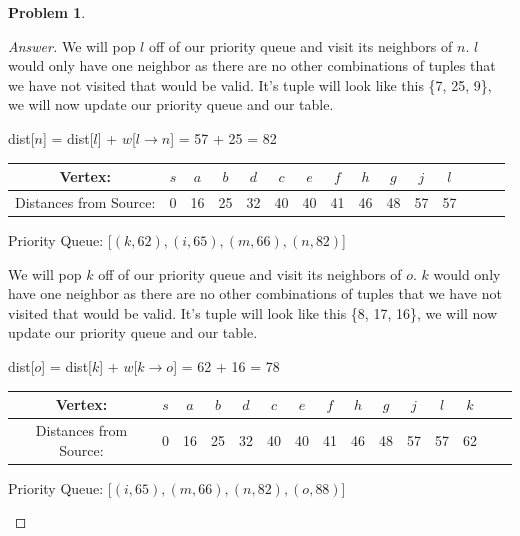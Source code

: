 \documentclass[11pt]{article}
\theoremstyle{definition}
\theoremstyle{definition}
\newtheorem{required}{Problem}
\theoremstyle{definition}
\begin{document}
\begin{required}
\begin{enumerate}[label=(\alph*)]
\begin{proof}[Answer]
We will pop $l$ off of our priority queue and visit its neighbors of $n$. $l$ would only have one neighbor as there are no other combinations of tuples that we have not visited that would be valid. It's tuple will look like this \{7, 25, 9\}, we will now update our priority queue and our table.
\begin{center}
dist[$n$] = dist[$l$]  + $w$[$l \rightarrow n$] = 57 + 25 = 82 \\
\begin{tabular}{ | c | c | c | c | c | c | c | c | c | c | c | c | c | c | c |}
 \hline
 Vertex:& $s$ & $a$ & $b$ & $d$ & $c$ & $e$ & $f$ & $h$ & $g$ & $j$ & $l$\\ 
 \hline
 Distances from Source:& 0 & 16 & 25 & 32 & 40 & 40 & 41 & 46 & 48 & 57 & 57 \\  
 \hline
\end{tabular}
\end{center}
\begin{center}
Priority Queue: [$(k,62), (i, 65), (m, 66), (n, 82)$]
\end{center}

We will pop $k$ off of our priority queue and visit its neighbors of $o$. $k$ would only have one neighbor as there are no other combinations of tuples that we have not visited that would be valid. It's tuple will look like this \{8, 17, 16\}, we will now update our priority queue and our table.
\begin{center}
dist[$o$] = dist[$k$]  + $w$[$k \rightarrow o$] = 62 + 16 = 78 \\
\begin{tabular}{ | c | c | c | c | c | c | c | c | c | c | c | c | c | c | c |}
 \hline
 Vertex:& $s$ & $a$ & $b$ & $d$ & $c$ & $e$ & $f$ & $h$ & $g$ & $j$ & $l$ & $k$\\ 
 \hline
 Distances from Source:& 0 & 16 & 25 & 32 & 40 & 40 & 41 & 46 & 48 & 57 & 57 & 62 \\  
 \hline
\end{tabular}
\end{center}
\begin{center}
Priority Queue: [$(i, 65), (m, 66), (n, 82), (o, 88)$]
\end{center}


\end{proof}
\end{enumerate}
\end{required}
\end{document}
